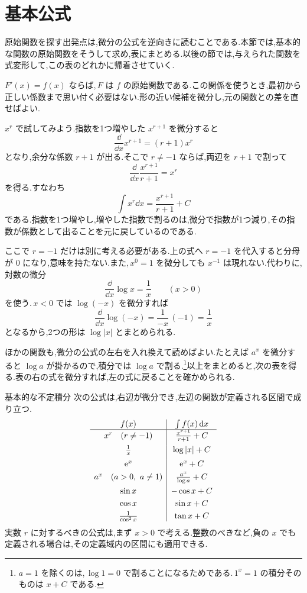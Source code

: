 \section{基本公式}\label{節:基本公式の逆}

原始関数を探す出発点は,微分の公式を逆向きに読むことである.本節では,基本的な関数の原始関数をそうして求め,表にまとめる.以後の節では,与えられた関数を式変形して,この表のどれかに帰着させていく.

$F'(x)=f(x)$ ならば,\,$F$ は $f$ の原始関数である.この関係を使うとき,最初から正しい係数まで思い付く必要はない.形の近い候補を微分し,元の関数との差を直せばよい.

$x^r$ で試してみよう.指数を1つ増やした $x^{r+1}$ を微分すると
\[
 \frac{\dd}{\dd x}x^{r+1}=(r+1)x^r
\]
となり,余分な係数 $r+1$ が出る.そこで $r\ne-1$ ならば,両辺を $r+1$ で割って
\[
 \frac{\dd}{\dd x}\frac{x^{r+1}}{r+1}=x^r
\]
を得る.すなわち
\[
 \int x^r\dd x=\frac{x^{r+1}}{r+1}+C
\]
である.指数を1つ増やし,増やした指数で割るのは,微分で指数が1つ減り,その指数が係数として出ることを元に戻しているのである.

ここで $r=-1$ だけは別に考える必要がある.上の式へ $r=-1$ を代入すると分母が $0$ になり,意味を持たない.また,\,$x^0=1$ を微分しても $x^{-1}$ は現れない.代わりに,対数の微分
\[
 \frac{\dd}{\dd x}\log x=\frac1x\qquad(x>0)
\]
を使う.\,$x<0$ では $\log(-x)$ を微分すれば
\[
 \frac{\dd}{\dd x}\log(-x)
 =\frac1{-x}\,(-1)=\frac1x
\]
となるから,2つの形は $\log|x|$ とまとめられる.

ほかの関数も,微分の公式の左右を入れ換えて読めばよい.たとえば $a^x$ を微分すると $\log a$ が掛かるので,積分では $\log a$ で割る.\footnote{$a=1$ を除くのは,\,$\log1=0$ で割ることになるためである.\,$1^x=1$ の積分そのものは $x+C$ である.}以上をまとめると,次の表を得る.表の右の式を微分すれば,左の式に戻ることを確かめられる.

\begin{theorem}{基本的な不定積分}
次の公式は,右辺が微分でき,左辺の関数が定義される区間で成り立つ.
\[
\begin{array}{c|c}
 f(x)&\int f(x)\,\mathrm{d} x\\ \hline
 x^r\quad(r\ne-1)&\frac{x^{r+1}}{r+1}+C\\[5pt]
 \frac1x&\log|x|+C\\[5pt]
 \mathrm{e}^x&\mathrm{e}^x+C\\[3pt]
 a^x\quad(a>0,\ a\ne1)&\frac{a^x}{\log a}+C\\[5pt]
 \sin x&-\cos x+C\\[3pt]
 \cos x&\sin x+C\\[3pt]
 \frac1{\cos^2x}&\tan x+C
\end{array}
\]
実数 $r$ に対するべきの公式は,まず $x>0$ で考える.整数のべきなど,負の $x$ でも定義される場合は,その定義域内の区間にも適用できる.
\end{theorem}

